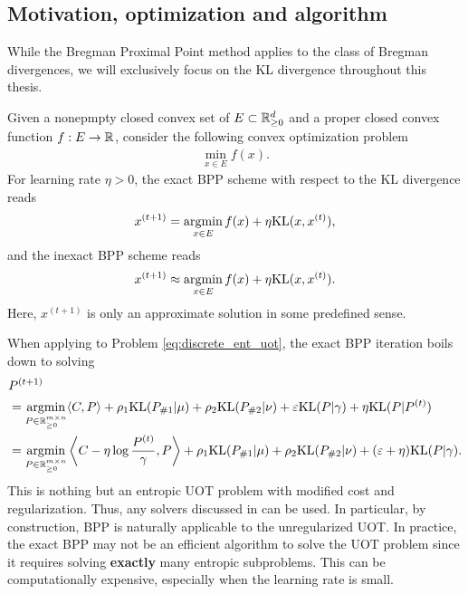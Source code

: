 \subsection{Motivation, optimization and algorithm}

While the Bregman Proximal Point method \citep{Chen93} applies to the class of Bregman divergences,
we will exclusively focus on the KL divergence throughout this thesis.
\begin{definition}
  Given a nonepmpty closed convex set of $E \subset \mathbb R^d_{\geq 0}$
  and a proper closed convex function $f: E \to \mathbb R$, consider the following
  convex optimization problem
  \begin{align}
    \min_{x \in E} f(x).
  \end{align}
  For learning rate $\eta > 0$, the exact BPP scheme with respect to the KL divergence reads
  \begin{align}
    \label{eq:bppa}
    x^{(t+1)} = \operatorname*{argmin}_{x \in E} f(x) + \eta \text{KL}(x, x^{(t)}),
  \end{align}
  and the inexact BPP scheme reads
  \begin{align}
    \label{eq:bppa_inexact}
    x^{(t+1)} \approx \operatorname*{argmin}_{x \in E} f(x) + \eta \text{KL}(x, x^{(t)}).
  \end{align}
  Here, $x^{(t+1)}$ is only an approximate solution in some predefined sense.
\end{definition}
When applying to Problem \eqref{eq:discrete_ent_uot}, the exact BPP iteration boils down to solving
\begin{align}
\label{eq:bpp_uot}
  &P^{(t+1)} \\
  &= \operatorname*{argmin}_{P \in \mathbb R^{m \times n}_{\geq 0}}
  \langle C, P \rangle + \rho_1 \text{KL}(P_{\# 1} | \mu)
  + \rho_2 \text{KL}(P_{\# 2} | \nu) + \varepsilon \text{KL}(P | \gamma) + \eta \text{KL}(P | P^{(t)}) \\
  &= \operatorname*{argmin}_{P \in \mathbb R^{m \times n}_{\geq 0}}
  \left \langle C - \eta \log \frac{P^{(t)}}{\gamma}, P \right \rangle
  + \rho_1 \text{KL}(P_{\# 1} | \mu) + \rho_2 \text{KL}(P_{\# 2} | \nu) + (\varepsilon + \eta) \text{KL}(P | \gamma).
\end{align}
This is nothing but an entropic UOT problem with modified cost and regularization.
Thus, any solvers discussed in  can be used. In particular,
by construction, BPP is naturally applicable to the unregularized UOT.
In practice, the exact BPP may not be an efficient algorithm to solve the UOT problem since
it requires solving \textbf{exactly} many entropic subproblems. This can be computationally expensive,
especially when the learning rate is small.

